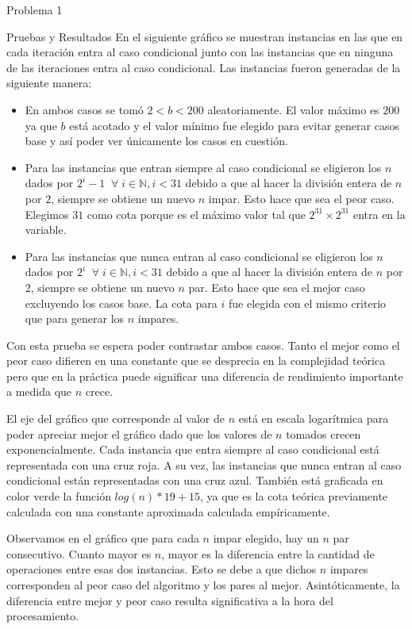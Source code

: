 \begin{section}{Problema 1}
\begin{subsection}{Pruebas y Resultados}
En el siguiente gráfico se muestran instancias en las que en cada iteración entra al caso condicional junto con las instancias que en ninguna de las iteraciones entra al caso condicional. Las instancias fueron generadas de la siguiente manera:
\begin{itemize}
	\item En ambos casos se tomó $2 < b < 200$ aleatoriamente. El valor máximo es $200$ ya que $b$ está acotado y el valor mínimo fue elegido para evitar generar casos base y así poder ver únicamente los casos en cuestión.
	\item Para las instancias que entran siempre al caso condicional se eligieron los $n$ dados por $2^i-1\;\;\forall\; i\in\mathbb{N}, i < 31$ debido a que al hacer la división entera de $n$ por $2$, siempre se obtiene un nuevo $n$ impar. Esto hace que sea el peor caso. Elegimos $31$ como cota porque es el máximo valor tal que $2^{31} \times 2^{31}$ entra en la variable.
	\item Para las instancias que nunca entran al caso condicional se eligieron los $n$ dados por $2^i\;\;\forall\; i\in\mathbb{N}, i < 31$ debido a que al hacer la división entera de $n$ por $2$, siempre se obtiene un nuevo $n$ par. Esto hace que sea el mejor caso excluyendo los casos base. La cota para $i$ fue elegida con el mismo criterio que para generar los $n$ impares.
\end{itemize}

	Con esta prueba se espera poder contrastar ambos casos. Tanto el mejor como el peor caso difieren en una constante que se desprecia en la complejidad teórica pero que en la práctica puede significar una diferencia de rendimiento importante a medida que $n$ crece.

El eje del gráfico que corresponde al valor de $n$ está en escala logarítmica para poder apreciar mejor el gráfico dado que los valores de $n$ tomados crecen exponencialmente. Cada instancia que entra siempre al caso condicional está representada con una cruz roja. A su vez, las instancias que nunca entran al caso condicional están representadas con una cruz azul. También está graficada en color verde la función $log(n)*19+15$, ya que es la cota teórica previamente calculada con una constante aproximada calculada empíricamente.\VSP

		\VSP

Observamos en el gráfico que para cada $n$ impar elegido, hay un $n$ par consecutivo. Cuanto mayor es $n$, mayor es la diferencia entre la cantidad de operaciones entre esas dos instancias. Esto se debe a que dichos $n$ impares corresponden al peor caso del algoritmo y los pares al mejor. Asintóticamente, la diferencia entre mejor y peor caso resulta significativa a la hora del procesamiento.


\end{subsection}
\end{section}
